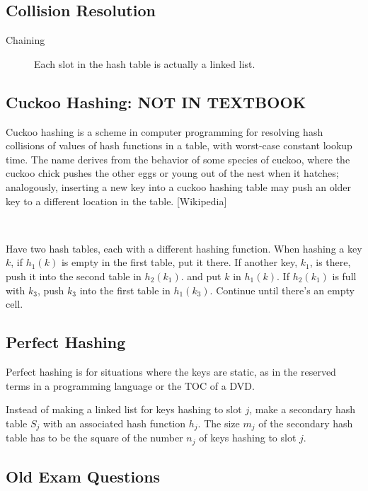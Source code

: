 \subsection{Collision Resolution}

\begin{description}
	\item [Chaining]  Each slot in the hash table is actually a linked list.  
\end{description}

\subsection{Cuckoo Hashing:  NOT IN TEXTBOOK}

Cuckoo hashing is a scheme in computer programming for resolving hash collisions of values of hash functions in a table, with worst-case constant lookup time. The name derives from the behavior of some species of cuckoo, where the cuckoo chick pushes the other eggs or young out of the nest when it hatches; analogously, inserting a new key into a cuckoo hashing table may push an older key to a different location in the table. [Wikipedia]

\

Have two hash tables, each with a different hashing function.  When hashing a key $k$, if $h_1(k)$ is empty in the first table, put it there.  If another key, $k_1$, is there, push it into the second table in $h_2(k_1)$.  and put $k$ in $h_1(k)$.  If $h_2(k_1)$ is full with $k_3$, push $k_3$ into the first table in $h_1(k_3)$.  Continue until there's an empty cell.  

\subsection{Perfect Hashing}

Perfect hashing is for situations where the keys are static, as in the reserved terms in a programming language or the TOC of a DVD.  

Instead of making a linked list for keys hashing to slot $j$, make a secondary hash table $S_j$ with an associated hash function $h_j$.  The size $m_j$ of the secondary hash table has to be the square of the number $n_j$ of keys hashing to slot $j$.  

\subsection{Old Exam Questions}

